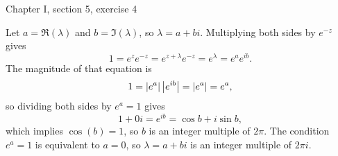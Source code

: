 \documentclass{article}
\begin{document}
\bigskip
\par
\begin{prob}
    Chapter I, section 5, exercise 4
\end{prob}
Let $a = \Re(\lambda)$ and $b = \Im(\lambda)$, so $\lambda = a+bi$. Multiplying both sides by $e^{-z}$ gives
\[ 1 = e^z e^{-z} = e^{z+\lambda}e^{-z} = e^\lambda = e^a e^{ib}. \]
The magnitude of that equation is
\[ 1 = \left\lvert e^a \right\rvert \left\lvert e^{ib} \right\rvert = \left\lvert e^a \right\rvert = e^a, \]
so dividing both sides by $e^a=1$ gives
\[ 1+0i = e^{ib}=\cos b + i \sin b, \]
which implies $\cos(b)=1$, so $b$ is an integer multiple of $2 \pi$. The condition $e^a=1$ is equivalent to $a=0$, so $\lambda=a+bi$ is an integer multiple of $2 \pi i$.


\end{document}
